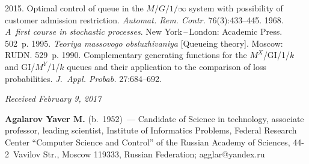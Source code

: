 \begin{multicols}{2}
{{\begin{thebibliography}{9}
 2015. Optimal control of 
queue in the $M/G/1/\infty$ system with possibility of customer admission 
restriction. \textit{Automat. Rem. Contr.} 
76(3):433--445.
 1968. \textit{A~first course in stochastic processes}. 
New York\,--\,London: Academic Press. 502~p.
 1995. \textit{Teoriya massovogo 
obsluzhivaniya} [Queueing theory]. Moscow: RUDN. 529~p.
 1990. Complementary generating functions for the 
$M^X$/GI/1/$k$ and GI/$M^Y$/1/$k$ queues and their application to the comparison of 
loss probabilities. \textit{J.~Appl. Probab.} 27:684--692.
\end{thebibliography}

 }
 }

\end{multicols}

\vspace*{-3pt}

\hfill{\small\textit{Received February 9, 2017}}
  
  \Contrl
  
  \noindent
   \textbf{Agalarov Yaver M.} (b.\ 1952)~--- Candidate of Science in technology, associate professor, 
leading scientist, Institute of Informatics Problems, Federal Research Center ``Computer Science and 
Control'' of the Russian Academy of Sciences, 44-2~Vavilov Str., Moscow 119333, Russian Federation; 
\mbox{agglar@yandex.ru}
  
   
  
\label{end\stat}


\renewcommand{\bibname}{\protect\rm Литература} 
   